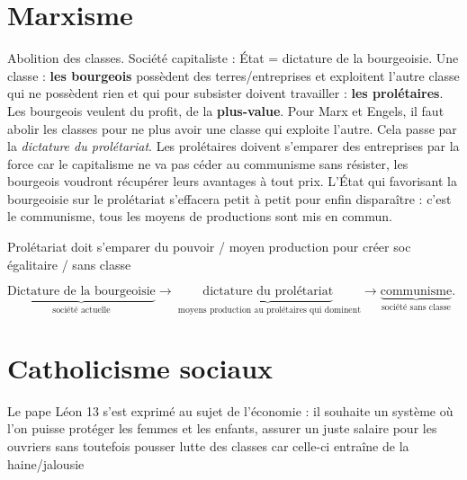 \section{Marxisme}
Abolition des classes. Société capitaliste : \'Etat = dictature de la bourgeoisie. Une classe : \textbf{les bourgeois}  possèdent des terres/entreprises et exploitent l'autre classe qui ne possèdent rien et qui pour subsister doivent travailler : \textbf{les prolétaires}. Les bourgeois veulent du profit, de la \textbf{plus-value}. Pour Marx et Engels, il faut abolir les classes pour ne plus avoir une classe qui exploite l'autre. Cela passe par la \textit{dictature du prolétariat}. Les prolétaires doivent s'emparer des entreprises par la force car le capitalisme ne va pas céder au communisme sans résister, les bourgeois voudront récupérer leurs avantages à tout prix. L'\'Etat qui favorisant la bourgeoisie sur le prolétariat s'effacera petit à petit pour enfin disparaître : c'est le communisme, tous les moyens de productions sont mis en commun.

Prolétariat doit s'emparer du pouvoir / moyen production pour créer soc égalitaire / sans classe
\vspace{0.3cm}

\textbf{$\underbrace{\text{Dictature de la bourgeoisie}}_{\text{société actuelle}}  \rightarrow \underbrace{\text{dictature du prolétariat}}_{\text{ moyens production au prolétaires qui dominent}} \rightarrow \underbrace{\text{communisme}}_{\text{société sans classe}}.$}
\section{Catholicisme sociaux}
Le pape Léon 13 s'est exprimé au sujet de l'économie : il souhaite un système où l'on puisse protéger les femmes et les enfants, assurer un juste salaire pour les ouvriers sans toutefois pousser lutte des classes car celle-ci entraîne de la haine/jalousie

